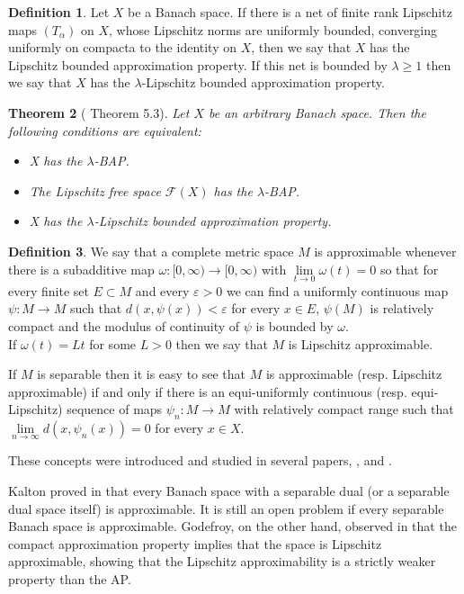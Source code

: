 \documentclass[11pt]{amsart}
\newcommand{\ep}{\varepsilon}
\newcommand{\<}{\langle}
\renewcommand{\>}{\rangle}
\newtheorem{theorem}{Theorem}[section]
\theoremstyle{definition}
\newtheorem{definition}[theorem]{Definition}
\theoremstyle{remark}
\numberwithin{equation}{section}
\begin{document}
\begin{definition}
Let $X$ be a Banach space. If there is a net of finite rank Lipschitz maps $(T_\alpha)$ on $X$, whose Lipschitz norms are uniformly bounded, converging uniformly on compacta to the identity on $X$, then we say that $X$ has the Lipschitz bounded approximation property. If this net is bounded by $\lambda\ge1$ then we  say that $X$ has the $\lambda$-Lipschitz bounded approximation property.
\end{definition}

\begin{theorem}[\cite{GK03} Theorem 5.3]\label{GODKAL}
Let $X$ be an arbitrary Banach space. Then the following conditions are equivalent:
\begin{itemize}
\item X has the $\lambda$-BAP.
\item The Lipschitz free space $\mathcal{F}(X)$ has the $\lambda$-BAP.
\item X has the $\lambda$-Lipschitz bounded approximation property.
\end{itemize}
\end{theorem}

\begin{definition}
We say that a complete metric space $M$ is approximable whenever there is a subadditive map $\omega:[0,\infty)\rightarrow[0,\infty)$ with $\lim\limits_{t\to0}\omega(t)=0$ so that for every finite set $E\subset M$ and every $\ep>0$ we can find a uniformly continuous map $\psi:M\rightarrow M$ such that $d(x,\psi(x))<\ep$ for every $x\in E$, $\psi(M)$ is relatively compact and the modulus of continuity of  $\psi$ is bounded by $\omega$.\\
If $\omega(t)=Lt$ for some $L>0$ then we say that $M$ is Lipschitz approximable.
\end{definition}

If $M$ is separable then it is easy to see that $M$ is approximable (resp. Lipschitz approximable) if and only if there is an equi-uniformly continuous (resp. equi-Lipschitz) sequence of maps $\psi_n:M\rightarrow M$ with relatively compact range such that $\lim\limits_{n\to\infty}d(x,\psi_n(x))=0$ for every $x\in X$.

These concepts were  introduced and studied in several papers, \cite{Kal04}, \cite{Kal12} and \cite{GLZ14}.



Kalton proved in \cite{Kal12} that every Banach space with a separable dual (or a separable dual space itself) is
approximable. It is still an open problem if every separable Banach space is approximable.
Godefroy, on the other hand, observed in \cite{God20} that the compact approximation property implies that the space is
Lipschitz approximable, showing  that  the Lipschitz approximability is a strictly weaker property than the AP.\\
\end{document}
